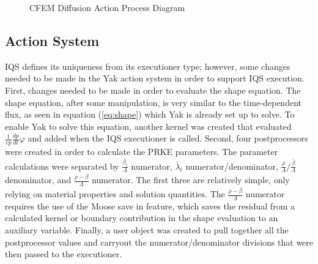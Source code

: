 \documentclass[11pt]{scrartcl}
\begin{document}
\begin{figure}[h]
\caption{CFEM Diffusion Action Process Diagram}   
\label{Action}
\end{figure}
\subsection{Action System}
IQS defines its uniqueness from its executioner type; however, some changes needed to be made in the Yak action system in order to support IQS execution.   First, changes needed to be made in order to evaluate the shape equation.  The shape equation, after some manipulation, is very similar to the time-dependent flux, as seen in equation (\ref{eq:shape}) which Yak is already set up to solve.  To enable Yak to solve this equation, another kernel was created that evaluated $\frac{1}{vp}\frac{dp}{dt}\varphi$ and added when the IQS executioner is called.  Second, four postprocessors were created in order to calculate the PRKE parameters.  The parameter calculations were separated by $\frac{\bar{\beta}_i}{\Lambda}$ numerator, $\bar{\lambda}_i$ numerator/denominator, $\frac{\rho}{\Lambda}/\frac{\bar{\beta}}{\Lambda}$ denominator, and $\frac{\rho-\bar{\beta}}{\Lambda}$ numerator.  The first three are relatively simple, only relying on material properties and solution quantities.  The $\frac{\rho-\bar{\beta}}{\Lambda}$ numerator requires the use of the Moose save in feature, which saves the residual from a calculated kernel or boundary contribution in the shape evaluation to an auxiliary variable.  Finally, a user object was created to pull together all the postprocessor values and carryout the numerator/denominator divisions that were then passed to the executioner.
\end{document}
